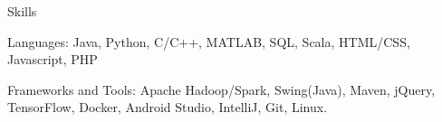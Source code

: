\documentclass{resume} %
\begin{document}
\begin{pSection}{Skills}
\item Languages: Java, Python, C/C++, MATLAB, SQL, Scala, HTML/CSS, Javascript, PHP
\item Frameworks and Tools: Apache Hadoop/Spark, Swing(Java), Maven, jQuery, TensorFlow, Docker, Android Studio, IntelliJ, Git, Linux.
\end{pSection}




\end{document}
